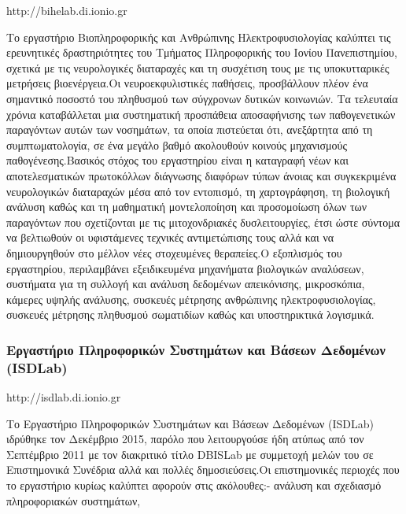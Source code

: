 http://bihelab.di.ionio.gr

Το εργαστήριο Βιοπληροφορικής και Ανθρώπινης Ηλεκτροφυσιολογίας καλύπτει
τις ερευνητικές δραστηριότητες του Τμήματος Πληροφορικής του Ιονίου
Πανεπιστημίου, σχετικά με τις νευρολογικές διαταραχές και τη συσχέτιση
τους με τις υποκυτταρικές μετρήσεις βιοενέργεια.Οι νευροεκφυλιστικές
παθήσεις, προσβάλλουν πλέον ένα σημαντικό ποσοστό του πληθυσμού των
σύγχρονων δυτικών κοινωνιών. Τα τελευταία χρόνια καταβάλλεται μια
συστηματική προσπάθεια αποσαφήνισης των παθογενετικών παραγόντων αυτών
των νοσημάτων, τα οποία πιστεύεται ότι, ανεξάρτητα από τη
συμπτωματολογία, σε ένα μεγάλο βαθμό ακολουθούν κοινούς μηχανισμούς
παθογένεσης.Βασικός στόχος του εργαστηρίου είναι η καταγραφή νέων και
αποτελεσματικών πρωτοκόλλων διάγνωσης διαφόρων τύπων άνοιας και
συγκεκριμένα νευρολογικών διαταραχών μέσα από τον εντοπισμό, τη
χαρτογράφηση, τη βιολογική ανάλυση καθώς και τη μαθηματική μοντελοποίηση
και προσομοίωση όλων των παραγόντων που σχετίζονται με τις
μιτοχονδριακές δυσλειτουργίες, έτσι ώστε σύντομα να βελτιωθούν οι
υφιστάμενες τεχνικές αντιμετώπισης τους αλλά και να δημιουργηθούν στο
μέλλον νέες στοχευμένες θεραπείες.Ο εξοπλισμός του εργαστηρίου,
περιλαμβάνει εξειδικευμένα μηχανήματα βιολογικών αναλύσεων, συστήματα
για τη συλλογή και ανάλυση δεδομένων απεικόνισης, μικροσκόπια, κάμερες
υψηλής ανάλυσης, συσκευές μέτρησης ανθρώπινης ηλεκτροφυσιολογίας,
συσκευές μέτρησης πληθυσμού σωματιδίων καθώς και υποστηρικτικά
λογισμικά.

\hypertarget{ux3b5ux3c1ux3b3ux3b1ux3c3ux3c4ux3aeux3c1ux3b9ux3bf-ux3c0ux3bbux3b7ux3c1ux3bfux3c6ux3bfux3c1ux3b9ux3baux3ceux3bd-ux3c3ux3c5ux3c3ux3c4ux3b7ux3bcux3acux3c4ux3c9ux3bd-ux3baux3b1ux3b9-ux3b2ux3acux3c3ux3b5ux3c9ux3bd-ux3b4ux3b5ux3b4ux3bfux3bcux3adux3bdux3c9ux3bd-isdlab}{%
\subsubsection{Εργαστήριο Πληροφορικών Συστημάτων και Βάσεων Δεδομένων
(ISDLab)}\label{ux3b5ux3c1ux3b3ux3b1ux3c3ux3c4ux3aeux3c1ux3b9ux3bf-ux3c0ux3bbux3b7ux3c1ux3bfux3c6ux3bfux3c1ux3b9ux3baux3ceux3bd-ux3c3ux3c5ux3c3ux3c4ux3b7ux3bcux3acux3c4ux3c9ux3bd-ux3baux3b1ux3b9-ux3b2ux3acux3c3ux3b5ux3c9ux3bd-ux3b4ux3b5ux3b4ux3bfux3bcux3adux3bdux3c9ux3bd-isdlab}}

http://isdlab.di.ionio.gr

Το Εργαστήριο Πληροφορικών Συστημάτων και Βάσεων Δεδομένων (ISDLab)
ιδρύθηκε τον Δεκέμβριο 2015, παρόλο που λειτουργούσε ήδη ατύπως από τον
Σεπτέμβριο 2011 με τον διακριτικό τίτλο DBISLab με συμμετοχή μελών του
σε Επιστημονικά Συνέδρια αλλά και πολλές δημοσιεύσεις.Οι επιστημονικές
περιοχές που το εργαστήριο κυρίως καλύπτει αφορούν στις ακόλουθες:-
ανάλυση και σχεδιασμό πληροφοριακών συστημάτων,

